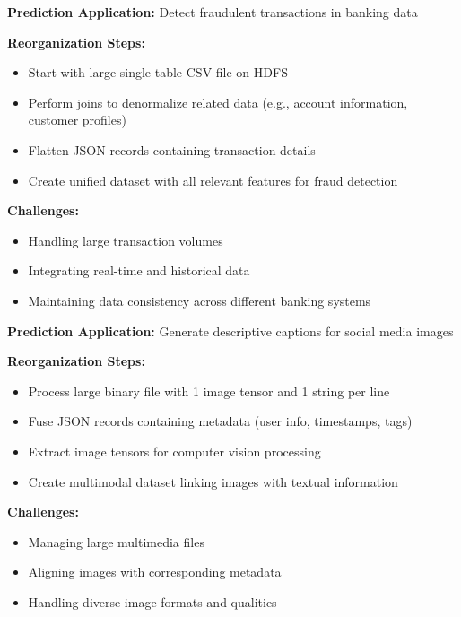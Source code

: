 \documentclass[12pt]{article}
\begin{document}
\begin{tcolorbox}[colback=blue!5!white,colframe=blue!75!black,title={Example: Fraud Detection in Banking}]
\textbf{Prediction Application:} Detect fraudulent transactions in banking data

\textbf{Reorganization Steps:}
\begin{itemize}
    \item Start with large single-table CSV file on HDFS
    \item Perform joins to denormalize related data (e.g., account information, customer profiles)
    \item Flatten JSON records containing transaction details
    \item Create unified dataset with all relevant features for fraud detection
\end{itemize}

\textbf{Challenges:}
\begin{itemize}
    \item Handling large transaction volumes
    \item Integrating real-time and historical data
    \item Maintaining data consistency across different banking systems
\end{itemize}
\end{tcolorbox}

\begin{tcolorbox}[colback=blue!5!white,colframe=blue!75!black,title={Example: Image Captioning on Social Media}]
\textbf{Prediction Application:} Generate descriptive captions for social media images

\textbf{Reorganization Steps:}
\begin{itemize}
    \item Process large binary file with 1 image tensor and 1 string per line
    \item Fuse JSON records containing metadata (user info, timestamps, tags)
    \item Extract image tensors for computer vision processing
    \item Create multimodal dataset linking images with textual information
\end{itemize}

\textbf{Challenges:}
\begin{itemize}
    \item Managing large multimedia files
    \item Aligning images with corresponding metadata
    \item Handling diverse image formats and qualities
\end{itemize}
\end{tcolorbox}
\end{document}
